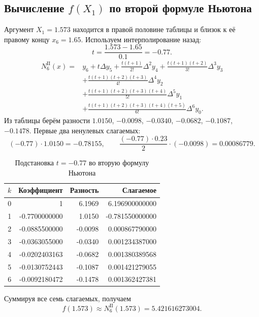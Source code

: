 \documentclass[12pt,a4paper]{article}
\begin{document}
\subsection{Вычисление $f(X_1)$ по второй формуле Ньютона}
Аргумент $X_1=1.573$ находится в правой половине таблицы и близок к её
правому концу $x_6=1.65$. Используем интерполирование назад:
\[
t=\frac{1.573-1.65}{0.1}=-0.77.
\]
\begin{align*}
N_6^{\mathrm{II}}(x)={}&y_6+t\Delta y_5+\frac{t(t+1)}{2!}\Delta^2y_4
 +\frac{t(t+1)(t+2)}{3!}\Delta^3y_3\\
&+\frac{t(t+1)(t+2)(t+3)}{4!}\Delta^4y_2\\
&+\frac{t(t+1)(t+2)(t+3)(t+4)}{5!}\Delta^5y_1\\
&+\frac{t(t+1)(t+2)(t+3)(t+4)(t+5)}{6!}\Delta^6y_0.
\end{align*}
Из таблицы берём разности $1.0150$, $-0.0098$, $-0.0340$, $-0.0682$,
$-0.1087$, $-0.1478$. Первые два ненулевых слагаемых:
\[
(-0.77)\cdot1.0150=-0.78155,
\qquad \frac{(-0.77)\cdot0.23}{2}\cdot(-0.0098)=0.00086779.
\]
\begin{table}[H]
\centering
\small
\caption{Подстановка $t=-0.77$ во вторую формулу Ньютона}
\begin{tabular}{rrrr}
\toprule
$k$ & Коэффициент & Разность & Слагаемое \\
\midrule
0 & 1 & 6.1969 & 6.196900000000 \\
1 & -0.7700000000 & 1.0150 & -0.781550000000 \\
2 & -0.0885500000 & -0.0098 & 0.000867790000 \\
3 & -0.0363055000 & -0.0340 & 0.001234387000 \\
4 & -0.0202403163 & -0.0682 & 0.001380389568 \\
5 & -0.0130752443 & -0.1087 & 0.001421279055 \\
6 & -0.0092180472 & -0.1478 & 0.001362427381 \\
\bottomrule
\end{tabular}
\end{table}

Суммируя все семь слагаемых, получаем
\[
\boxed{f(1.573)\approx N_6^{\mathrm{II}}(1.573)=5.421616273004}.
\]

\clearpage
\end{document}

